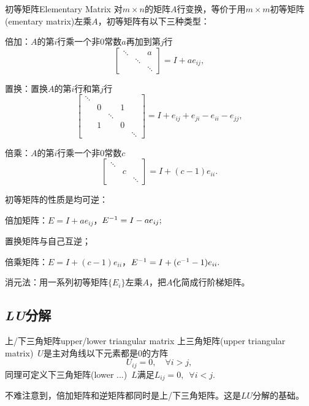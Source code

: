 \begin{definition}{初等矩阵}{Elementary Matrix}
	对$m\times n$的矩阵$A$行变换，等价于用$m\times m$初等矩阵(ementary matrix)左乘$A$，初等矩阵有以下三种类型：
	\begin{compactitem}
		\item 倍加：$A$的第$i$行乘一个非0常数$a$再加到第$j$行 
		\[
			\begin{bmatrix}
				\ddots&&a\\ &\ddots\\ &&\ddots
			\end{bmatrix}=I+ae_{ij},
		\]
		\item 置换：置换$A$的第$i$行和第$j$行 
		\[
			\begin{bmatrix}
				\ddots\\ &0&&1\\ &&\ddots\\ &1&&0\\ &&&&\ddots
			\end{bmatrix}=I+e_{ij}+e_{ji}-e_{ii}-e_{jj},
		\]
		\item 倍乘：$A$的第$i$行乘一个非0常数$c$
		\[
			\begin{bmatrix}
				\ddots\\ &c\\ &&\ddots
			\end{bmatrix}=I+(c-1)e_{ii}.
		\]
	\end{compactitem}
\end{definition}
初等矩阵的性质是均可逆：
\begin{compactitem}
	\item 倍加矩阵：$E=I+ae_{ij}$，$E^{-1}=I-ae_{ij};$
	\item 置换矩阵与自己互逆；
	\item 倍乘矩阵：$E=I+(c-1)e_{ii}$，$E^{-1}=I+(c^{-1}-1)e_{ii}.$
\end{compactitem}
消元法：用一系列初等矩阵$\{E_i\}$左乘$A$，把$A$化简成行阶梯矩阵。
\subsection{\textit{LU}分解}
\begin{definition}{上/下三角矩阵}{upper/lower triangular matrix}
	上三角矩阵(upper triangular matrix)~$U$是主对角线以下元素都是0的方阵
	\[
		U_{ij}=0,\quad\forall i>j,
	\]
	同理可定义下三角矩阵(lower ...)~$L$满足$L_{ij}=0,\enspace\forall i<j.$
\end{definition}
不难注意到，倍加矩阵和逆矩阵都同时是上/下三角矩阵。这是$LU$分解的基础。

